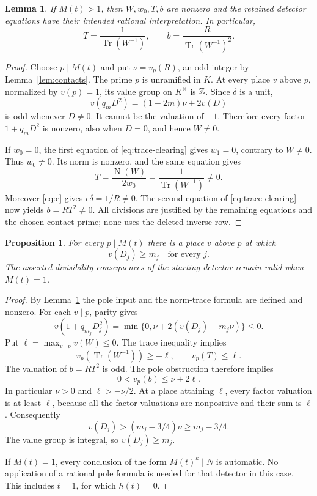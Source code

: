 \documentclass[11pt,a4paper]{article}
\newtheorem{lemma}[theorem]{Lemma}
\newtheorem{proposition}[theorem]{Proposition}
\theoremstyle{remark}\newtheorem{remark}[theorem]{Remark}
\DeclareMathOperator{\Tr}{Tr}\DeclareMathOperator{\N}{N}
\begin{document}
\begin{lemma}\label{lem:local-nonzero}
If $M(t)>1$, then $W,w_0,T,b$ are nonzero and the retained detector
equations have their intended rational interpretation. In particular,
\[
              T=\frac1{\Tr(W^{-1})},\qquad
              b=\frac{R}{\Tr(W^{-1})^2}.
\]
\end{lemma}
\begin{proof}
Choose $p\mid M(t)$ and put $\nu=v_p(R)$, an odd integer by
Lemma~\ref{lem:contacts}. The prime $p$ is unramified in $K$. At every
place $v$ above $p$, normalized by $v(p)=1$, its value group on $K^\times$
is $\mathbb Z$. Since $\delta$ is a unit,
\[
             v(q_mD^2)=(1-2m)\nu+2v(D)
\]
is odd whenever $D\ne0$. It cannot be the valuation of $-1$.
Therefore every factor $1+q_mD^2$ is nonzero, also when $D=0$,
and hence $W\ne0$.

If $w_0=0$, the first equation of \eqref{eq:trace-clearing} gives
$w_1=0$, contrary to $W\ne0$. Thus $w_0\ne0$. Its norm is nonzero,
and the same equation gives
\[
 T=\frac{\N(W)}{2w_0}
   =\frac1{\Tr(W^{-1})}\ne0.
\]
Moreover \eqref{eq:e} gives $e\delta=1/R\ne0$. The second equation
of \eqref{eq:trace-clearing} now yields $b=RT^2\ne0$.
All divisions are justified by the remaining equations and the chosen
contact prime; none uses the deleted inverse row.
\end{proof}

\begin{proposition}\label{prop:local-tests}
For every $p\mid M(t)$ there is a place $v$ above $p$ at which
\[
                         v(D_j)\ge m_j\quad\text{for every }j.
\]
The asserted divisibility consequences of the starting detector remain
valid when $M(t)=1$.
\end{proposition}
\begin{proof}
By Lemma~\ref{lem:local-nonzero} the pole input and the norm-trace
formula are defined and nonzero. For each $v\mid p$, parity gives
\[
 v(1+q_{m_j}D_j^2)
 =\min\{0,\nu+2(v(D_j)-m_j\nu)\}\le0.
\]
Put $\ell=\max_{v\mid p}v(W)\le0$. The trace inequality implies
\[
 v_p(\Tr(W^{-1}))\ge-\ell,
 \qquad v_p(T)\le\ell.
\]
The valuation of $b=RT^2$ is odd. The pole obstruction therefore
implies
\[
                      0<v_p(b)\le\nu+2\ell.
\]
In particular $\nu>0$ and $\ell>-\nu/2$. At a place attaining
$\ell$, every factor valuation is at least $\ell$, because all the
factor valuations are nonpositive and their sum is $\ell$.
Consequently
\[
              v(D_j)>(m_j-3/4)\nu\ge m_j-3/4.
\]
The value group is integral, so $v(D_j)\ge m_j$.

If $M(t)=1$, every conclusion of the form $M(t)^k\mid N$ is
automatic. No application of a rational pole formula is needed for
that detector in this case. This includes $t=1$, for which $h(t)=0$.
\end{proof}
\end{document}
